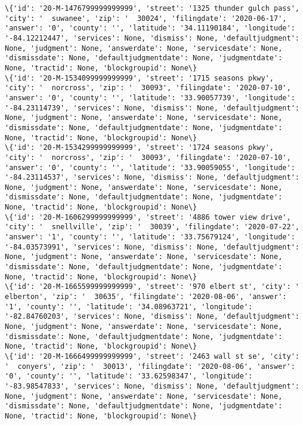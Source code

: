 \documentclass[11pt]{article}
\begin{document}
\begin{Verbatim}[commandchars=\\\{\}]
\{'id': '20-M-1476799999999999', 'street': '1325 thunder gulch pass', 'city': '  suwanee', 'zip': '  30024', 'filingdate': '2020-06-17', 'answer': '0', 'county': '', 'latitude': '34.11190184', 'longitude': '-84.12212447', 'services': None, 'dismiss': None, 'defaultjudgment': None, 'judgment': None, 'answerdate': None, 'servicesdate': None, 'dismissdate': None, 'defaultjudgmentdate': None, 'judgmentdate': None, 'tractid': None, 'blockgroupid': None\}
\{'id': '20-M-1534099999999999', 'street': '1715 seasons pkwy', 'city': '  norcross', 'zip': '  30093', 'filingdate': '2020-07-10', 'answer': '0', 'county': '', 'latitude': '33.90057739', 'longitude': '-84.23114739', 'services': None, 'dismiss': None, 'defaultjudgment': None, 'judgment': None, 'answerdate': None, 'servicesdate': None, 'dismissdate': None, 'defaultjudgmentdate': None, 'judgmentdate': None, 'tractid': None, 'blockgroupid': None\}
\{'id': '20-M-1534299999999999', 'street': '1724 seasons pkwy', 'city': '  norcross', 'zip': '  30093', 'filingdate': '2020-07-10', 'answer': '0', 'county': '', 'latitude': '33.90059055', 'longitude': '-84.23114537', 'services': None, 'dismiss': None, 'defaultjudgment': None, 'judgment': None, 'answerdate': None, 'servicesdate': None, 'dismissdate': None, 'defaultjudgmentdate': None, 'judgmentdate': None, 'tractid': None, 'blockgroupid': None\}
\{'id': '20-M-1606299999999999', 'street': '4886 tower view drive', 'city': '  snellville', 'zip': '  30039', 'filingdate': '2020-07-22', 'answer': '1', 'county': '', 'latitude': '33.75679124', 'longitude': '-84.03573991', 'services': None, 'dismiss': None, 'defaultjudgment': None, 'judgment': None, 'answerdate': None, 'servicesdate': None, 'dismissdate': None, 'defaultjudgmentdate': None, 'judgmentdate': None, 'tractid': None, 'blockgroupid': None\}
\{'id': '20-M-1665599999999999', 'street': '970 elbert st', 'city': '  elberton', 'zip': '  30635', 'filingdate': '2020-08-06', 'answer': '1', 'county': '', 'latitude': '34.08963721', 'longitude': '-82.84760203', 'services': None, 'dismiss': None, 'defaultjudgment': None, 'judgment': None, 'answerdate': None, 'servicesdate': None, 'dismissdate': None, 'defaultjudgmentdate': None, 'judgmentdate': None, 'tractid': None, 'blockgroupid': None\}
\{'id': '20-M-1666499999999999', 'street': '2463 wall st se', 'city': '  conyers', 'zip': '  30013', 'filingdate': '2020-08-06', 'answer': '0', 'county': '', 'latitude': '33.62598347', 'longitude': '-83.98547833', 'services': None, 'dismiss': None, 'defaultjudgment': None, 'judgment': None, 'answerdate': None, 'servicesdate': None, 'dismissdate': None, 'defaultjudgmentdate': None, 'judgmentdate': None, 'tractid': None, 'blockgroupid': None\}

\end{Verbatim}
\end{document}
